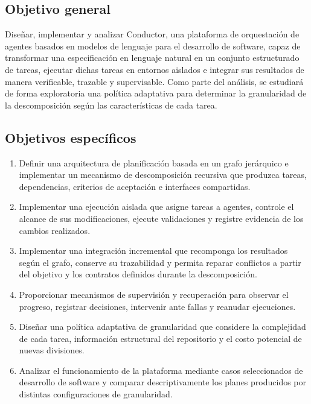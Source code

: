 \documentclass[11pt,a4paper]{article}
\begin{document}
\subsection*{Objetivo general}

Dise\~nar, implementar y analizar Conductor, una plataforma de orquestaci\'on de
agentes basados en modelos de lenguaje para el desarrollo de software, capaz de
transformar una especificaci\'on en lenguaje natural en un conjunto estructurado
de tareas, ejecutar dichas tareas en entornos aislados e integrar sus resultados
de manera verificable, trazable y supervisable. Como parte del an\'alisis, se
estudiar\'a de forma exploratoria una pol\'itica adaptativa para determinar la
granularidad de la descomposici\'on seg\'un las caracter\'isticas de cada tarea.

\subsection*{Objetivos espec\'ificos}

\begin{enumerate}
  \item Definir una arquitectura de planificaci\'on basada en un grafo jer\'arquico
  e implementar un mecanismo de descomposici\'on recursiva que produzca tareas,
  dependencias, criterios de aceptaci\'on e interfaces compartidas.

  \item Implementar una ejecuci\'on aislada que asigne tareas a agentes, controle
  el alcance de sus modificaciones, ejecute validaciones y registre evidencia
  de los cambios realizados.

  \item Implementar una integraci\'on incremental que recomponga los resultados
  seg\'un el grafo, conserve su trazabilidad y permita reparar conflictos a partir
  del objetivo y los contratos definidos durante la descomposici\'on.

  \item Proporcionar mecanismos de supervisi\'on y recuperaci\'on para observar el
  progreso, registrar decisiones, intervenir ante fallas y reanudar ejecuciones.

  \item Dise\~nar una pol\'itica adaptativa de granularidad que considere la
  complejidad de cada tarea, informaci\'on estructural del repositorio y el costo
  potencial de nuevas divisiones.

  \item Analizar el funcionamiento de la plataforma mediante casos seleccionados
  de desarrollo de software y comparar descriptivamente los planes producidos
  por distintas configuraciones de granularidad.
\end{enumerate}
\end{document}
